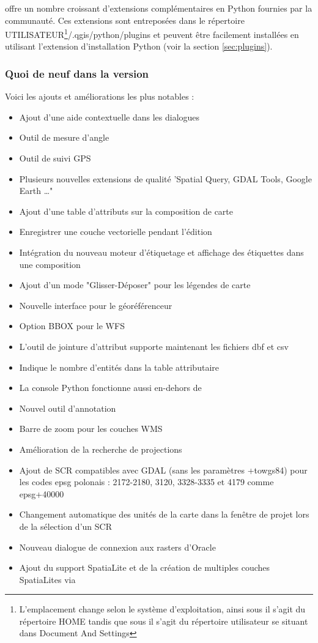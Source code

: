 
\qg offre un nombre croissant d'extensions complémentaires en Python fournies par la communauté. Ces extensions sont entreposées dans le répertoire UTILISATEUR\footnote{L'emplacement change selon le système d'exploitation, ainsi sous \nix{} il s'agit du répertoire HOME tandis que sous \win{} il s'agit du répertoire utilisateur se situant dans Document And Settings}/.qgis/python/plugins et peuvent être facilement installées en utilisant l'extension d'installation Python (voir la section \ref{sec:plugins}). 

\subsubsection{Quoi de neuf dans la version ~\CURRENT} 

Voici les ajouts et améliorations les plus notables :
\begin{itemize}[label=--]
 \item Ajout d'une aide contextuelle dans les dialogues
 \item Outil de mesure d'angle
 \item Outil de suivi GPS 
 \item Plusieurs nouvelles extensions de qualité 'Spatial Query, GDAL Tools, Google Earth \dots"
 \item Ajout d'une table d'attributs sur la composition de carte
 \item Enregistrer une couche vectorielle pendant l'édition
 \item Intégration du nouveau moteur d'étiquetage et affichage des étiquettes dans une composition
 \item Ajout d'un mode "Glisser-Déposer" pour les légendes de carte
 \item Nouvelle interface pour le géoréférenceur
 \item Option BBOX pour le WFS 
 \item L'outil de jointure d'attribut supporte maintenant les fichiers dbf et csv
 \item Indique le nombre d'entités dans la table attributaire
 \item La console Python fonctionne aussi en-dehors de \qg
 \item Nouvel outil d'annotation
 \item Barre de zoom pour les couches WMS
 \item Amélioration de la recherche de projections
 \item Ajout de SCR compatibles avec GDAL (sans les paramètres +towgs84) pour les codes epsg polonais : 2172-2180, 3120, 3328-3335 et 4179 comme epsg+40000
 \item Changement automatique des unités de la carte dans la fenêtre de projet lors de la sélection d'un SCR
 \item Nouveau dialogue de connexion aux rasters d'Oracle
 \item Ajout du support SpatiaLite et de la création de multiples couches SpatiaLites via \qg
\end{itemize}

